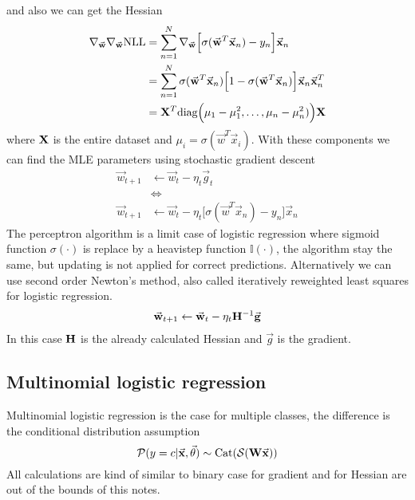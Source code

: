 \documentclass[../main.tex]{subfiles}
\begin{document}
and also we can get the Hessian 
\begin{align*}
    \nabla_{\vec{w}} \nabla_{\vec{w}} \text{NLL}
    &= \sum_{n=1}^N 
    \nabla_{\vec{w}} \Big[\sigma(\vec{w}^T\vec{x}_n)-y_n\Big]\vec{x}_n\\
    &= \sum_{n=1}^N
    \sigma(\vec{w}^T\vec{x}_n)\Big[1-\sigma(\vec{w}^T\vec{x}_n)\Big]\vec{x}_n\vec{x}_n^T\\
    &= \mat{X}^T \text{diag}\Big(\mu_1-\mu_1^2,\dots,\mu_n-\mu_n^2)\Big) \mat{X}
\end{align*}
where $\mathbf{X}$ is the entire dataset and $\mu_i=\sigma(\vec{w}^T\vec{x}_i)$. With these components we can find the MLE parameters using stochastic gradient descent
\begin{align*}
    \vec{w}_{t+1} &\leftarrow \vec{w}_{t} - \eta_t\vec{g}_t \\
    &\Longleftrightarrow\\
    \vec{w}_{t+1} &\leftarrow \vec{w}_{t} - \eta_t\Big[\sigma(\vec{w}^T\vec{x}_n)-y_n\Big]\vec{x}_n
\end{align*}
The perceptron algorithm is a limit case of logistic regression where sigmoid function $\sigma(\cdot)$ is replace by a heavistep function $\mathbb{I}(\cdot)$, the algorithm stay the same, but updating is not applied for correct predictions.
Alternatively we can use second order Newton's method, also called iteratively reweighted least squares for logistic regression.
\begin{align*}
    \vec{w}_{t+1} &\leftarrow \vec{w}_{t} - \eta_t\mat{H}^{-1}\vec{g} \\
\end{align*}
In this case $\mathbf{H}$ is the already calculated Hessian and $\vec{g}$ is the gradient.
\subsection{Multinomial logistic regression}
Multinomial logistic regression is the case for multiple classes, the difference is the conditional distribution assumption
\begin{equation*}
    \p(y=c|\vec{x},\vec{\theta}) \sim \text{Cat}(\mathcal{S}(\mat{W} \vec{x}))
\end{equation*}
All calculations are kind of similar to binary case for gradient and for Hessian are out of the bounds of this notes.
\end{document}
